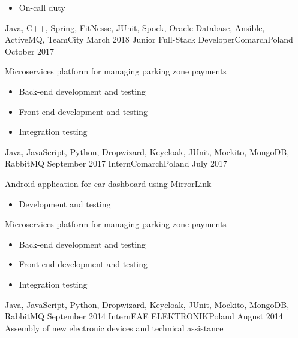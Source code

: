 \begin{experiences}
{\begin{itemize}
                            \item On-call duty
                        \end{itemize}
                    }
                    {Java, C++, Spring, FitNesse, JUnit, Spock, Oracle Database, Ansible, ActiveMQ, TeamCity}
  \emptySeparator
  \experience
    {March 2018}     {Junior Full-Stack Developer}{Comarch}{Poland}
    {October 2017}    {
                        Microservices platform for managing parking zone payments
                        \begin{itemize}
                            \item Back-end development and testing
                            \item Front-end development and testing
                            \item Integration testing
                        \end{itemize}
                    }
                    {Java, JavaScript, Python, Dropwizard, Keycloak, JUnit, Mockito, MongoDB, RabbitMQ}
  \emptySeparator
  \experience
  {September 2017}       {Intern}{Comarch}{Poland}
  {July 2017}      {
                        Android application for car dashboard using MirrorLink
                        \begin{itemize}
                            \item Development and testing
                        \end{itemize}
                        Microservices platform for managing parking zone payments
                        \begin{itemize}
                            \item Back-end development and testing
                            \item Front-end development and testing
                            \item Integration testing
                        \end{itemize}
                    }
                    {Java, JavaScript, Python, Dropwizard, Keycloak, JUnit, Mockito, MongoDB, RabbitMQ}
  \emptySeparator
  \emptyexperience
  {September 2014}      {Intern}{EAE ELEKTRONIK}{Poland}
  {August 2014}     {Assembly of new electronic devices and technical assistance}

\end{experiences}
